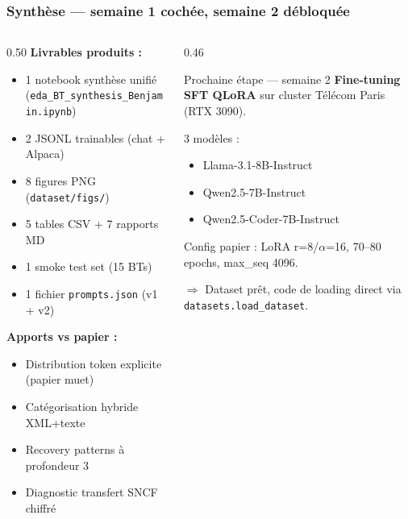 \documentclass[aspectratio=169]{beamer}
\begin{document}
\begin{frame}
  \frametitle{Synthèse --- semaine 1 cochée, semaine 2 débloquée}

  \begin{columns}[T]
    \begin{column}{0.50\textwidth}
      \textbf{\small Livrables produits :}

      {\scriptsize
      \begin{itemize}\itemsep1pt
        \item 1 notebook synthèse unifié (\texttt{eda\_BT\_synthesis\_Benjamin.ipynb})
        \item 2 JSONL trainables (chat + Alpaca)
        \item 8 figures PNG (\texttt{dataset/figs/})
        \item 5 tables CSV + 7 rapports MD
        \item 1 smoke test set (15 BTs)
        \item 1 fichier \texttt{prompts.json} (v1 + v2)
      \end{itemize}}

      \vspace{0.5em}
      \textbf{\small Apports vs papier :}

      {\scriptsize
      \begin{itemize}\itemsep1pt
        \item Distribution token explicite (papier muet)
        \item Catégorisation hybride XML+texte
        \item Recovery patterns à profondeur 3
        \item Diagnostic transfert SNCF chiffré
      \end{itemize}}
    \end{column}
    \begin{column}{0.46\textwidth}
      \begin{alertblock}{Prochaine étape --- semaine 2}
        \small \textbf{Fine-tuning SFT QLoRA} sur cluster Télécom Paris (RTX 3090).

        \vspace{0.3em}
        3 modèles :
        \begin{itemize}\itemsep0pt
          \item Llama-3.1-8B-Instruct
          \item Qwen2.5-7B-Instruct
          \item Qwen2.5-Coder-7B-Instruct
        \end{itemize}

        \vspace{0.2em}
        Config papier : LoRA r=8/$\alpha$=16, 70--80 epochs, max\_seq 4096.

        \vspace{0.3em}
        $\Rightarrow$ Dataset prêt, code de loading direct via \texttt{datasets.load\_dataset}.
      \end{alertblock}
    \end{column}
  \end{columns}
\end{frame}
\end{document}
